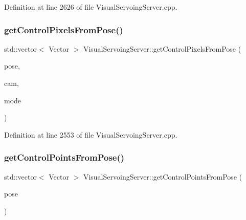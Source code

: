 Definition at line 2626 of file Visual\+Servoing\+Server.\+cpp.

\mbox{\label{classVisualServoingServer_a67bfc714271a28bf55fa49c89019b53c}} 
\subsubsection{\texorpdfstring{get\+Control\+Pixels\+From\+Pose()}{getControlPixelsFromPose()}}
{\footnotesize\ttfamily std\+::vector$<$ Vector $>$ Visual\+Servoing\+Server\+::get\+Control\+Pixels\+From\+Pose (\begin{DoxyParamCaption}\item[{const yarp\+::sig\+::\+Vector \&}]{pose,  }\item[{const Cam\+Sel \&}]{cam,  }\item[{const \hyperlink{classVisualServoingServer_a3a1cce02f57cebb9056da5653d4dff0e}{Pixel\+Control\+Mode} \&}]{mode }\end{DoxyParamCaption})\hspace{0.3cm}{\ttfamily [private]}}



Definition at line 2553 of file Visual\+Servoing\+Server.\+cpp.

\mbox{\label{classVisualServoingServer_ac9e6020f30b6df05db3fc34a44fee0d4}} 
\subsubsection{\texorpdfstring{get\+Control\+Points\+From\+Pose()}{getControlPointsFromPose()}}
{\footnotesize\ttfamily std\+::vector$<$ Vector $>$ Visual\+Servoing\+Server\+::get\+Control\+Points\+From\+Pose (\begin{DoxyParamCaption}\item[{const yarp\+::sig\+::\+Vector \&}]{pose }\end{DoxyParamCaption})\hspace{0.3cm}{\ttfamily [private]}}



